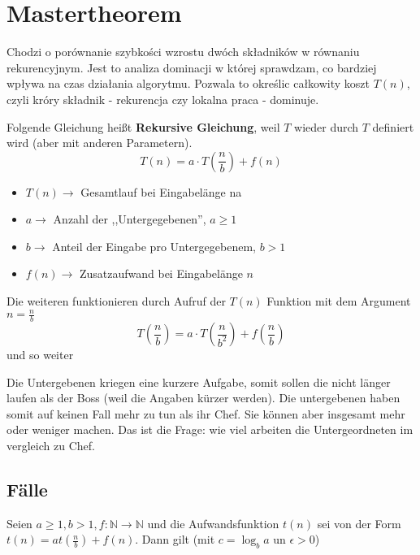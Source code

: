 \section{Mastertheorem}
    Chodzi o porównanie szybkości wzrostu dwóch składników w równaniu rekurencyjnym. Jest to analiza dominacji w której sprawdzam, co bardziej wpływa na czas działania algorytmu. Pozwala to określic całkowity koszt $T(n)$, czyli króry składnik - rekurencja czy lokalna praca - dominuje.
\begin{tcolorbox}[blue = {Allgemeine Teilen und Herrschen}]
    Folgende Gleichung heißt \textbf{Rekursive Gleichung}, weil $T$ wieder durch $T$ definiert wird (aber mit anderen Parametern).
    \[
        T(n) = a \cdot T(\frac{n}{b}) + f(n)
    \]

    \begin{itemize}[noitemsep, topsep=0pt]
        \item $T(n) \rightarrow$ Gesamtlauf bei Eingabelänge na
        \item $a \rightarrow$ Anzahl der ,,Untergegebenen'', $a \geq 1$
        \item $b \rightarrow$ Anteil der Eingabe pro Untergegebenem, $b > 1$
        \item $f(n) \rightarrow$ Zusatzaufwand bei Eingabelänge $n$
    \end{itemize}

    \vspace{1cm}
    Die weiteren funktionieren durch Aufruf der $T(n)$ Funktion mit dem Argument $n = \frac{n}{b}$
    \[
        T(\frac{n}{b}) = a \cdot T(\frac{n}{b^2}) + f(\frac{n}{b})
    \]
    und so weiter

\end{tcolorbox}

\begin{tcolorbox}[red = {Hinweis}]
    Die Untergebenen kriegen eine kurzere Aufgabe, somit sollen die nicht länger laufen als der Boss (weil die Angaben kürzer werden). Die untergebenen haben somit auf keinen Fall mehr zu tun als ihr Chef. Sie können aber insgesamt mehr oder weniger machen. Das ist die Frage: wie viel arbeiten die Untergeordneten im vergleich zu Chef.
\end{tcolorbox}


\subsection{Fälle}
    \begin{tcolorbox}[blue = {Mastertheorem}]
        Seien $a \geq 1, b > 1, f : \mathbb{N} \rightarrow \mathbb{N}$ und die Aufwandsfunktion $t(n)$ sei von der Form $t(n) = at(\frac{n}{b}) + f(n)$. Dann gilt (mit $c = \log_b a$ un $\epsilon > 0$)
    \end{tcolorbox}

